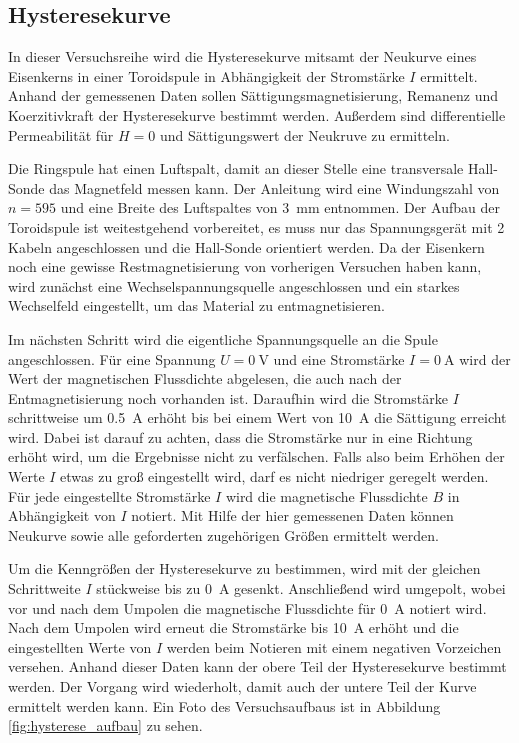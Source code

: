 \subsection{Hysteresekurve}
In dieser Versuchsreihe wird die Hysteresekurve mitsamt der Neukurve eines Eisenkerns in einer Toroidspule 
in Abhängigkeit der Stromstärke $I$ ermittelt.
Anhand der gemessenen Daten sollen Sättigungsmagnetisierung, Remanenz und Koerzitivkraft der Hysteresekurve bestimmt werden.
Außerdem sind differentielle Permeabilität für $H = 0$ und Sättigungswert der Neukruve zu ermitteln.

\noindent
Die Ringspule hat einen Luftspalt, damit an dieser Stelle eine transversale Hall-Sonde das Magnetfeld messen kann.
Der Anleitung wird eine Windungszahl von $n = 595$ und eine Breite des Luftspaltes von \qty[]{3}{\mm} entnommen.
Der Aufbau der Toroidspule ist weitestgehend vorbereitet, es muss nur das Spannungsgerät mit 2 Kabeln angeschlossen und die Hall-Sonde orientiert werden.
Da der Eisenkern noch eine gewisse Restmagnetisierung von vorherigen Versuchen haben kann,
wird zunächst eine Wechselspannungsquelle angeschlossen und ein starkes Wechselfeld eingestellt, um das Material zu entmagnetisieren.

\noindent
Im nächsten Schritt wird die eigentliche Spannungsquelle an die Spule angeschlossen.
Für eine Spannung $U = \qty[]{0}{\volt}$ und eine Stromstärke $I = \qty[]{0}{\ampere}$ wird der Wert der magnetischen Flussdichte abgelesen, 
die auch nach der Entmagnetisierung noch vorhanden ist.
Daraufhin wird die Stromstärke $I$ schrittweise um \qty[]{0.5}{\ampere} erhöht bis bei einem Wert von \qty[]{10}{\ampere} die Sättigung erreicht wird.
Dabei ist darauf zu achten, dass die Stromstärke nur in eine Richtung erhöht wird, um die Ergebnisse nicht zu verfälschen.
Falls also beim Erhöhen der Werte $I$ etwas zu groß eingestellt wird, darf es nicht niedriger geregelt werden.
Für jede eingestellte Stromstärke $I$ wird die magnetische Flussdichte $B$ in Abhängigkeit von $I$ notiert.
Mit Hilfe der hier gemessenen Daten können Neukurve sowie alle geforderten zugehörigen Größen ermittelt werden.

\noindent
Um die Kenngrößen der Hysteresekurve zu bestimmen, wird mit der gleichen Schrittweite $I$ stückweise bis zu \qty[]{0}{\ampere} gesenkt.
Anschließend wird umgepolt, wobei vor und nach dem Umpolen die magnetische Flussdichte für \qty[]{0}{\ampere} notiert wird.
Nach dem Umpolen wird erneut die Stromstärke bis \qty[]{10}{\ampere} erhöht und die eingestellten Werte von $I$ werden beim Notieren
mit einem negativen Vorzeichen versehen.
Anhand dieser Daten kann der obere Teil der Hysteresekurve bestimmt werden.
Der Vorgang wird wiederholt, damit auch der untere Teil der Kurve ermittelt werden kann.
Ein Foto des Versuchsaufbaus ist in Abbildung \ref{fig:hysterese_aufbau} zu sehen.



